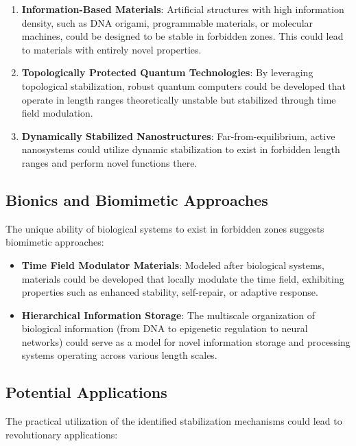 \documentclass[12pt,a4paper]{article}
\begin{document}
	\begin{enumerate}
		\item \textbf{Information-Based Materials}: Artificial structures with high information density, such as DNA origami, programmable materials, or molecular machines, could be designed to be stable in forbidden zones. This could lead to materials with entirely novel properties.
		
		\item \textbf{Topologically Protected Quantum Technologies}: By leveraging topological stabilization, robust quantum computers could be developed that operate in length ranges theoretically unstable but stabilized through time field modulation.
		
		\item \textbf{Dynamically Stabilized Nanostructures}: Far-from-equilibrium, active nanosystems could utilize dynamic stabilization to exist in forbidden length ranges and perform novel functions there.
	\end{enumerate}
	
	\subsection{Bionics and Biomimetic Approaches}
	
	The unique ability of biological systems to exist in forbidden zones suggests biomimetic approaches:
	
	\begin{itemize}
		\item \textbf{Time Field Modulator Materials}: Modeled after biological systems, materials could be developed that locally modulate the time field, exhibiting properties such as enhanced stability, self-repair, or adaptive response.
		
		\item \textbf{Hierarchical Information Storage}: The multiscale organization of biological information (from DNA to epigenetic regulation to neural networks) could serve as a model for novel information storage and processing systems operating across various length scales.
	\end{itemize}
	
	\subsection{Potential Applications}
	
	The practical utilization of the identified stabilization mechanisms could lead to revolutionary applications:
	
\end{document}
